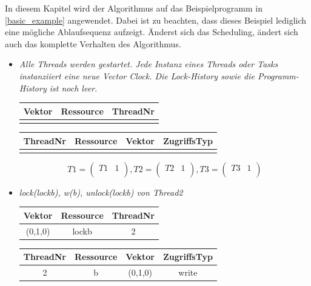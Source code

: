 \documentclass[10pt,a4paper]{article}
\begin{document}
\begin{flushleft}
In diesem Kapitel wird der Algorithmus auf das Beispielprogramm  in \autoref{basic_example} angewendet. Dabei ist zu beachten, dass dieses Beispiel lediglich eine mögliche Ablaufsequenz aufzeigt. Änderst sich das Scheduling, ändert sich auch das komplette Verhalten des Algorithmus.\\
\begin{itemize}
\item \textit{Alle Threads werden gestartet. Jede Instanz eines Threads oder Tasks instanziiert eine neue Vector Clock. Die Lock-History sowie die Programm-History ist noch leer.}\\[0.3cm]
\begin{tabular}{ >{\small}c >{\small}c >{\small}c }
  	Vektor & Ressource & ThreadNr \\\hline
  	  &   &   \\\hline
\end{tabular}\hspace*{0.5cm}
\begin{tabular}{ >{\small}c >{\small}c >{\small}c >{\small}c }
  	ThreadNr & Ressource & Vektor & ZugriffsTyp \\\hline
  	  &   &   &   \\\hline
\end{tabular}
\[
	T1 = \begin{pmatrix}
		T1 & 1\\
	\end{pmatrix}
	, T2 = \begin{pmatrix}
		T2 & 1\\
	\end{pmatrix}
	, T3 = \begin{pmatrix}
		T3 & 1\\
	\end{pmatrix}
\]
\item \textit{lock(lockb), w(b), unlock(lockb) von Thread2}\\[0.3cm]
\begin{tabular}{ >{\small}c >{\small}c >{\small}c }
  	Vektor & Ressource & ThreadNr \\\hline
  	(0,1,0) & lockb & 2 \\\hline
\end{tabular}\hspace*{0.5cm}
\begin{tabular}{ >{\small}c >{\small}c >{\small}c >{\small}c }
  	ThreadNr & Ressource & Vektor & ZugriffsTyp \\\hline
  	2 & b & (0,1,0) & write \\\hline

\end{tabular}
\end{itemize}
\end{flushleft}
\end{document}
